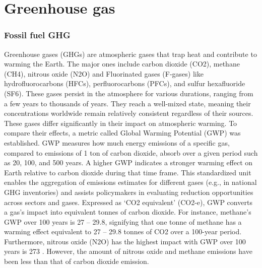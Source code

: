 \section{Greenhouse gas}
\subsubsection{Fossil fuel GHG}

Greenhouse gases (GHGs) are atmospheric gases that trap heat and contribute to warming the Earth. The major ones include carbon dioxide (CO2), methane (CH4), nitrous oxide (N2O) and Fluorinated gases (F-gases) like hydrofluorocarbons (HFCs), perfluorocarbons (PFCs), and sulfur hexafluoride (SF6). These gases persist in the atmosphere for various durations, ranging from a few years to thousands of years. They reach a well-mixed state, meaning their concentrations worldwide remain relatively consistent regardless of their sources. These gases differ significantly in their impact on atmospheric warming. To compare their effects, a metric called Global Warming Potential (GWP) was established. GWP measures how much energy emissions of a specific gas, compared to emissions of 1 ton of carbon dioxide, absorb over a given period such as 20, 100, and 500 years. A higher GWP indicates a stronger warming effect on Earth relative to carbon dioxide during that time frame. This standardized unit enables the aggregation of emissions estimates for different gases (e.g., in national GHG inventories) and assists policymakers in evaluating reduction opportunities across sectors and gases. Expressed as ‘CO2 equivalent’ (CO2-e), GWP converts a gas's impact into equivalent tonnes of carbon dioxide. For instance, methane's GWP over 100 years is 27 – 29.8, signifying that one tonne of methane has a warming effect equivalent to 27 – 29.8 tonnes of CO2 over a 100-year period. Furthermore, nitrous oxide (N2O) has the highest impact with GWP over 100 years is 273 \citep{RN3}. However, the amount of nitrous oxide and methane emissions have been less than that of carbon dioxide emission. \par
